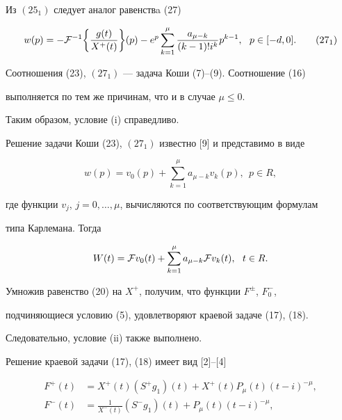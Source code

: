 Из $(25_1)$ следует аналог равенствa (27)


\begin{equation}


w(p)=-{\cal F}^{-1}\bigg\{\frac{g(t)}{X^+(t)}\bigg\}(p)-


e^{p}\sum_{k=1}^{\mu}\frac{a_{\mu -k}}{(k-1)!i^k} p^{k-1},


\ \ p\in [-d,0]. \tag{27$_1$}


\end{equation}


Соотношения (23), $(27_1)$ --- задача Коши (7)--(9). Соотношение (16)


выполняется по тем же причинам, что и в случае $\mu\leq 0$. 


Таким образом, условие (i) справедливо. 





Решение задачи Коши (23), $(27_1)$ известно [9] и представимо в виде 


$$


w(p)=v_0(p)+ \sum_{k=1}^{\mu} a_{\mu-k}v_k(p),\ \ p\in R,


$$


где функции $v_j$, $j=0,\dotsc,\mu$, вычисляются по соответствующим формулам


типа Карлемана. Тогда


\begin{equation}


W(t)={\cal F}v_0(t)+ \sum_{k=1}^{\mu} a_{\mu-k}{\cal F}v_k(t),\ \ t\in R.


\end{equation}





Умножив равенство (20) на $X^+$, получим, что функции $F^\pm$, $F_0^-$,


подчиняющиеся условию (5), удовлетворяют краевой задаче (17), (18).


Следовательно, условие (ii) также выполнено.





Решение краевой задачи (17), (18) имеет вид [2]--[4] 


\begin{align}


F^+(t)&=X^+(t) (S^+ g_1)(t)+X^+(t)P_\mu(t)(t-i)^{-\mu},\\


%


F^-(t)&=\frac{1}{X^-(t)} (S^-g_1)(t)+P_\mu(t)(t-i)^{-\mu},


\end{align}


